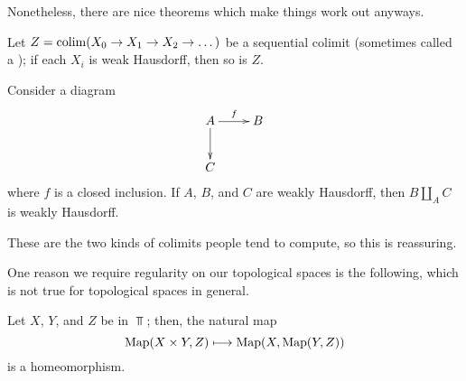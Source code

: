 Nonetheless, there are nice theorems which make things work out anyways.
\begin{prop}
Let $Z = \operatorname{colim}(X_0\to X_1\to X_2\to\dots)$ be a sequential colimit (sometimes called a ); if each
$X_i$ is weak Hausdorff, then so is $Z$.
\end{prop}
\begin{prop}
Consider a diagram
\[\xymatrix{
	A\ar[r]^f\ar[d] &B\\
	C
}\]
where $f$ is a closed inclusion. If $A$, $B$, and $C$ are weakly Hausdorff, then $B\amalg_A C$ is weakly Hausdorff.
\end{prop}
These are the two kinds of colimits people tend to compute, so this is reassuring.

One reason we require regularity on our topological spaces is the following, which is not true for topological
spaces in general.
\begin{lem}
Let $X$, $Y$, and $Z$ be in $\Top$; then, the natural map
\[\operatorname{Map}(X\times Y, Z)\longmapsto\operatorname{Map}(X, \operatorname{Map}(Y, Z))\]
is a homeomorphism.
\end{lem}
